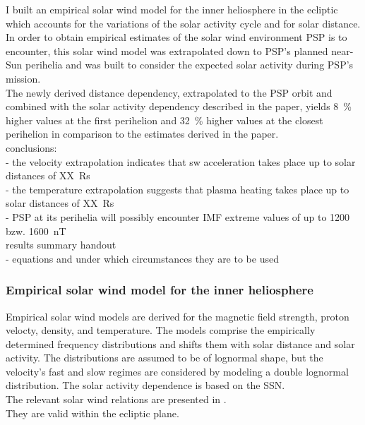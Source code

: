I built an empirical solar wind model for the inner heliosphere in the ecliptic which accounts for the variations of the solar activity cycle and for solar distance. In order to obtain empirical estimates of the solar wind environment PSP is to encounter, this solar wind model was extrapolated down to PSP's planned near-Sun perihelia and was built to consider the expected solar activity during PSP's mission.\\

The newly derived distance dependency, extrapolated to the PSP orbit and combined with the solar activity dependency described in the paper, yields \SI{8}{\%} higher values at the first perihelion and \SI{32}{\%} higher values at the closest perihelion in comparison to the estimates derived in the paper.\\

conclusions:\\
- the velocity extrapolation indicates that sw acceleration takes place up to solar distances of XX~Rs\\
- the temperature extrapolation suggests that plasma heating takes place up to solar distances of XX~Rs\\
- PSP at its perihelia will possibly encounter IMF extreme values of up to 1200 bzw. 1600~nT\\


results summary handout\\
- equations and under which circumstances they are to be used\\




\subsubsection*{Empirical solar wind model for the inner heliosphere}

Empirical solar wind models are derived for the magnetic field strength, proton velocty, density, and temperature. The models comprise the empirically determined frequency distributions and shifts them with solar distance and solar activity. The distributions are assumed to be of lognormal shape, but the velocity's fast and slow regimes are considered by modeling a double lognormal distribution. The solar activity dependence is based on the SSN.\\

The relevant solar wind relations are presented in \citet[p.~10]{Venzmer2018}.\\
They are valid within the ecliptic plane.\\


